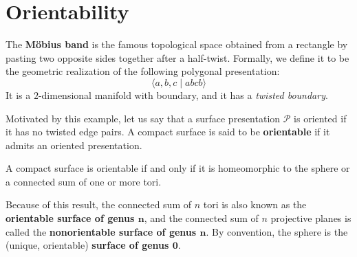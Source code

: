 \section{Orientability}
The \textbf{M\"obius band} is the famous topological space obtained from a rectangle by
pasting two opposite sides together after a half-twist. Formally, we define it to be
the geometric realization of the following polygonal presentation:
\[\langle a,b,c\mid abcb\rangle\]
It is a $2$-dimensional manifold with boundary, and it has a \textit{twisted boundary}.\par
Motivated by this example, let us say that a surface presentation $\mathcal{P}$ is oriented
if it has no twisted edge pairs. A compact surface is said to be \textbf{orientable} if it admits an oriented presentation.
\begin{proposition}
A compact surface is orientable if and only if it is homeomorphic to the sphere or a connected sum of one or more tori.
\end{proposition}
Because of this result, the connected sum of $n$ tori is also known as the \textbf{orientable surface of genus $\bm{n}$}, and the connected sum of $n$ projective planes is called the \textbf{nonorientable surface of genus $\bm{n}$}. By convention, the sphere is the (unique, orientable) \textbf{surface of genus $\bm{0}$}.
